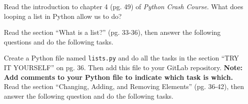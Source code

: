 \documentclass[a4paper,addpoints]{exam}
\begin{document}
\vspace{20pt}
\begin{questions}
    \question[10] Read the introduction to chapter 4 (pg. 49) of \textit{Python Crash Course}.
        What does looping a list in Python allow us to do?
        \begin{solutionorlines}[\stretch{1}]
        \end{solutionorlines}
    \question[20] Read the section ``What is a list?'' (pg. 33-36), then answer the following questions and do the following tasks.
        \question[10] Create a Python file named \texttt{lists.py} and do all the tasks in the section ``TRY IT YOURSELF'' on pg. 36.
            Then add this file to your GitLab repository.
        \textbf{Note: Add comments to your Python file to indicate which task is which.}
        \question[20] Read the section ``Changing, Adding, and Removing Elements'' (pg. 36-42), then answer the following question and do the following tasks. 
        \begin{parts}

\end{parts}
\end{questions}
\end{document}
